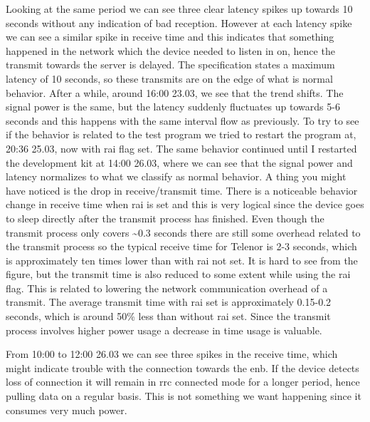 \documentclass[USenglish]{ifimaster}  %
\begin{document}
Looking at the same period we can see three clear latency spikes up towards 10 seconds without any indication of bad reception. However at each latency spike we can see a similar spike in receive time and this indicates that something happened in the network which the device needed to listen in on, hence the transmit towards the server is delayed. The specification states a maximum latency of 10 seconds, so these transmits are on the edge of what is normal behavior. After a while, around 16:00 23.03, we see that the trend shifts. The signal power is the same, but the latency suddenly fluctuates up towards 5-6 seconds and this happens with the same interval flow as previously. To try to see if the behavior is related to the test program we tried to restart the program at, 20:36 25.03, now with \acrshort{rai} flag set. The same behavior continued until I restarted the development kit at 14:00 26.03, where we can see that the signal power and latency normalizes to what we classify as normal behavior. A thing you might have noticed is the drop in receive/transmit time. There is a noticeable behavior change in receive time when \acrshort{rai} is set and this is very logical since the device goes to sleep directly after the transmit process has finished. Even though the transmit process only covers \textasciitilde0.3 seconds there are still some overhead related to the transmit process so the typical receive time for Telenor is 2-3 seconds, which is approximately ten times lower than with \acrshort{rai} not set. It is hard to see from the figure, but the transmit time is also reduced to some extent while using the \acrshort{rai} flag. This is related to lowering the network communication overhead of a transmit. The average transmit time with \acrshort{rai} set is approximately 0.15-0.2 seconds, which is around 50\% less than without \acrshort{rai} set. Since the transmit process involves higher power usage a decrease in time usage is valuable.

From 10:00 to 12:00 26.03 we can see three spikes in the receive time, which might indicate trouble with the connection towards the \acrshort{enb}. If the device detects loss of connection it will remain in \acrshort{rrc} connected mode for a longer period, hence pulling data on a regular basis. This is not something we want happening since it consumes very much power.
\end{document}
